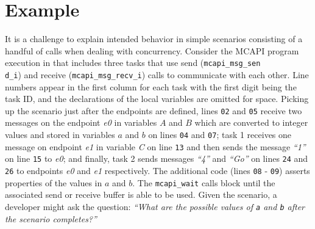 \section{Example}

It is a challenge to explain intended behavior in simple scenarios
consisting of a handful of calls when dealing with concurrency. Consider
the MCAPI program execution in  that includes three
tasks that use send (\texttt{mcapi\_msg\_sen\\d\_i}) and receive
(\texttt{mcapi\_msg\_recv\_i}) calls to communicate with each other.
Line numbers appear in the first column for each task with the first digit being the task ID, and the
declarations of the local variables are omitted for space. Picking up
the scenario just after the endpoints are defined, lines \texttt{02}
and \texttt{05} receive two messages on the endpoint
\textit{e0} in variables $A$ and $B$ which are
converted to integer values and stored in variables $a$ and
$b$ on lines \texttt{04} and \texttt{07}; task 1 receives one
message on endpoint \textit{e1} in variable \textit{C} on line
\texttt{13} and then sends the message \textit{``1''} on line \texttt{15} to
\textit{e0}; and finally, task 2 sends messages \textit{``4''} and \textit{``Go''} on
lines \texttt{24} and \texttt{26} to endpoints \textit{e0} and
\textit{e1} respectively. The additional code (lines \texttt{08} -
\texttt{09}) asserts properties of the values in $a$ and
$b$. The \texttt{mcapi\_wait} calls block until the associated
send or receive buffer is able to be used. Given the scenario, a developer
might ask the question: \emph{``What are the possible values of
\texttt{a} and \texttt{b} after the scenario completes?''}

